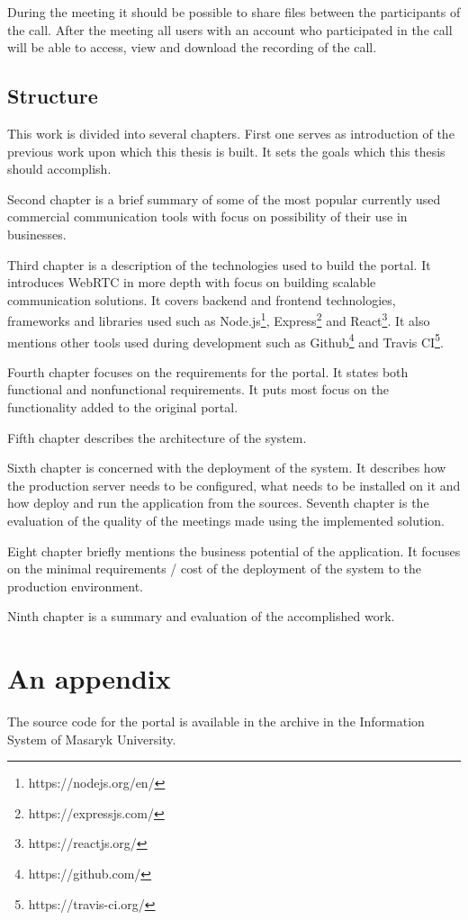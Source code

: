 \documentclass[
  digital, %
  table,   %
  lof,     %
  nolot,     %
]{fithesis3}
\begin{document}
During the meeting it should be possible to share files between the participants of the call. After the meeting all users with an account who participated in the call will be able to access, view and download the recording of the call.

\section{Structure}
This work is divided into several chapters. First one serves as introduction of the previous work upon which this thesis is built. It sets the goals which this thesis should accomplish.

Second chapter is a brief summary of some of the most popular currently used commercial communication tools with focus on possibility of their use in businesses.

Third chapter is a description of the technologies used to build the portal. It introduces WebRTC in more depth with focus on building scalable communication solutions. It covers backend and frontend technologies, frameworks and libraries used such as Node.js\footnote{https://nodejs.org/en/}, Express\footnote{https://expressjs.com/} and React\footnote{https://reactjs.org/}. It also mentions other tools used during development such as Github\footnote{https://github.com/} and Travis CI\footnote{https://travis-ci.org/}.

Fourth chapter focuses on the requirements for the portal. It states both functional and nonfunctional requirements. It puts most focus on the functionality added to the original portal.

Fifth chapter describes the architecture of the system.

Sixth chapter is concerned with the deployment of the system. It describes how the production server needs to be configured, what needs to be installed on it and how deploy and run the application from the sources.
Seventh chapter is the evaluation of the quality of the meetings made using the implemented solution.

Eight chapter briefly mentions the business potential of the application. It focuses on the minimal requirements / cost of the deployment of the system to the production environment.

Ninth chapter is a summary and evaluation of the accomplished work.

\printbibliography[heading=bibintoc] %

\appendix %
\chapter{An appendix}
The source code for the portal is available in the archive in the Information System of Masaryk University.
\end{document}
